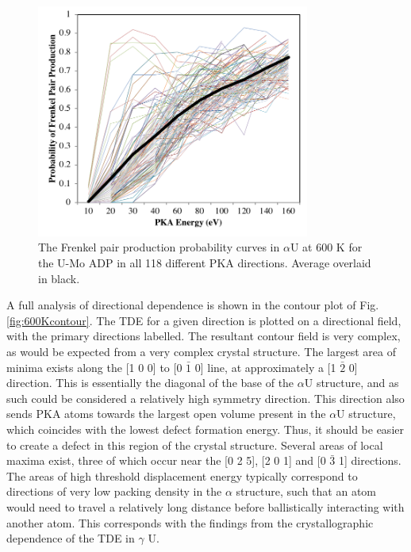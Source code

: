 \documentclass[review]{elsarticle}
\begin{document}
\begin{figure}[h]
 \centering
 \includegraphics[width=0.8\textwidth]{ed_dir_allF_alpha.png} 
 \caption{The Frenkel pair production probability curves in $\alpha$U at 600 K for the U-Mo ADP in all 118 different PKA directions. Average overlaid in black.}
 \label{fig:ed_diralpha}
\end{figure}

\FloatBarrier

A full analysis of directional dependence is shown in the contour plot of Fig. \ref{fig:600Kcontour}. The TDE for a given direction is plotted on a directional field, with the primary directions labelled. The resultant contour field is very complex, as would be expected from a very complex crystal structure. The largest area of minima exists along the [1 0 0] to [0 $\bar{1}$ 0] line, at approximately a [1 $\bar{2}$ 0] direction. This is essentially the diagonal of the base of the $\alpha$U structure, and as such could be considered a relatively high symmetry direction. This direction also sends PKA atoms towards the largest open volume present in the $\alpha$U structure, which coincides with the lowest defect formation energy. Thus, it should be easier to create a defect in this region of the crystal structure. Several areas of local maxima exist, three of which occur near the [0 2 5], [2 0 1] and [0 $\bar{3}$ 1] directions. The areas of high threshold displacement energy typically correspond to directions of very low packing density in the $\alpha$ structure, such that an atom would need to travel a relatively long distance before ballistically interacting with another atom. This corresponds with the findings from the crystallographic dependence of the TDE in $\gamma$ U. 
\end{document}

